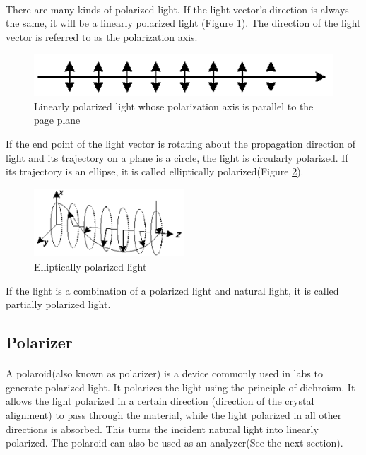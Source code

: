 \documentclass{my_template}
\begin{document}
    \paragraph{} There are many kinds of polarized light. If the light vector's direction is always the same, it will be a linearly polarized light (Figure \ref{fig:linearly polarized light demo}). The direction of the light vector is referred to as the polarization axis. 
    \begin{figure}[!ht]
        \centering
        \includegraphics[width=\textwidth]{fig/linearly_polarized_light.png}
        \caption{Linearly polarized light whose polarization axis is parallel to the page plane}
        \label{fig:linearly polarized light demo}
    \end{figure}
    If the end point of the light vector is rotating about the propagation direction of light and its trajectory on a plane is a circle, the light is circularly polarized. If its trajectory is an ellipse, it is called elliptically polarized(Figure \ref{fig:ellipse&circle}).
    \begin{figure}[!ht]
        \centering
        \includegraphics[width=0.5\textwidth]{fig/elliptically_polarized_light.png}
        \caption{Elliptically polarized light}
        \label{fig:ellipse&circle}
    \end{figure}
    If the light is a combination of a polarized light and natural light, it is called partially polarized light.
    \subsection{Polarizer}
    \paragraph{} A polaroid(also known as polarizer) is a device commonly used in labs to generate polarized light. It polarizes the light using the principle of dichroism. It allows the light polarized in a certain direction (direction of the crystal alignment) to pass through the material, while the light polarized in all other directions is absorbed. This turns the incident natural light into linearly polarized. The polaroid can also be used as an analyzer(See the next section).
\end{document}
